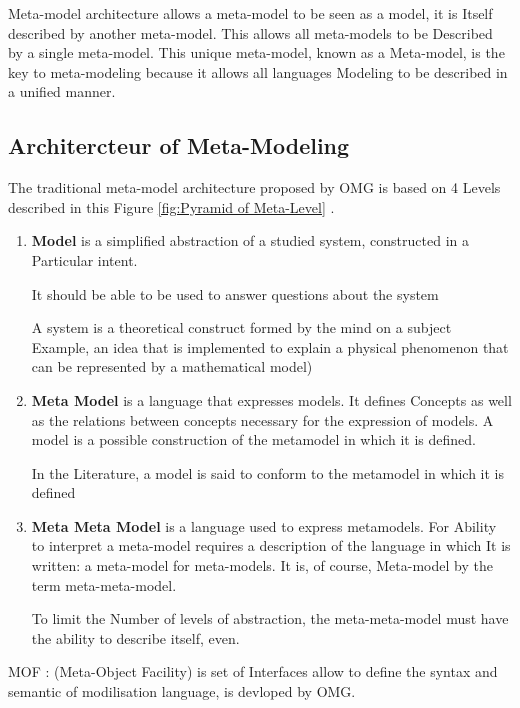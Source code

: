 Meta-model architecture allows a meta-model to be seen as a model, it is
Itself described by another meta-model. This allows all meta-models to be
Described by a single meta-model. This unique meta-model, known as a
Meta-model, is the key to meta-modeling because it allows all languages
Modeling to be described in a unified manner.


\subsection{Architercteur of Meta-Modeling}
The traditional meta-model architecture proposed by OMG is based on 4 Levels
described in this Figure \ref{fig:Pyramid of Meta-Level} \cite{ch3-doc, ch3-mml} .

\begin{enumerate}
\item \textbf{Model} is a simplified abstraction of a studied system, constructed in a
Particular intent. 

It should be able to be used to answer questions about the system

A system is a theoretical construct formed by the mind on a subject
Example, an idea that is implemented to explain a physical phenomenon that can
be represented by a mathematical model) 

\item \textbf{Meta Model} is a language that expresses models. It defines
Concepts as well as the relations between concepts necessary for the expression of models. 
A model is a possible construction of the metamodel in which it is defined.

In the Literature, a model is said to conform to the metamodel in which it is defined

\item \textbf{Meta Meta Model} is a language used to express metamodels. 
For Ability to interpret a meta-model requires a description of the language in which
It is written: a meta-model for meta-models. 
It is, of course, Meta-model by the term meta-meta-model. 

To limit the  Number of levels of abstraction, the meta-meta-model 
must have the ability to describe itself, even. 
 

\end{enumerate}

MOF : (Meta-Object Facility) is set of Interfaces allow to define 
the syntax and semantic of modilisation language, is devloped by OMG\cite{ch3-doc, ch3-doc}.

